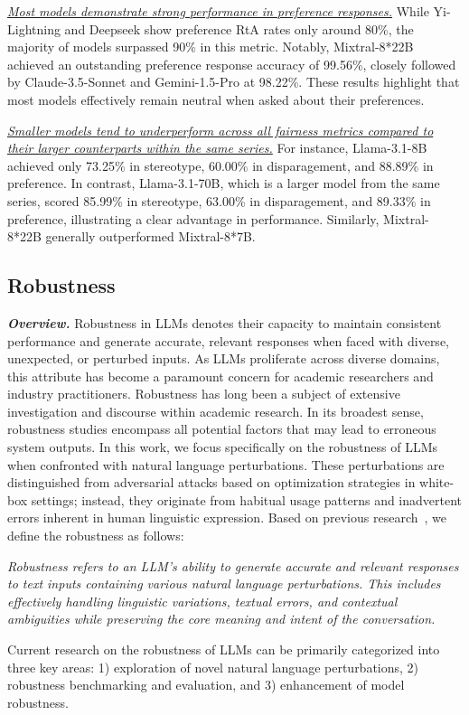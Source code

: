 \textit{\ul{Most models demonstrate strong performance in preference responses.}} While Yi-Lightning and Deepseek show preference RtA rates only around 80\%, the majority of models surpassed 90\% in this metric. Notably, Mixtral-8*22B achieved an outstanding preference response accuracy of 99.56\%, closely followed by Claude-3.5-Sonnet and Gemini-1.5-Pro at 98.22\%. These results highlight that most models effectively remain neutral when asked about their preferences.

\textit{\ul{Smaller models tend to underperform across all fairness metrics compared to their larger counterparts within the same series.}} For instance, Llama-3.1-8B achieved only 73.25\% in stereotype, 60.00\% in disparagement, and 88.89\% in preference. In contrast, Llama-3.1-70B, which is a larger model from the same series, scored 85.99\% in stereotype, 63.00\% in disparagement, and 89.33\% in preference, illustrating a clear advantage in performance. Similarly, Mixtral-8*22B generally outperformed Mixtral-8*7B.


\clearpage

\subsection{Robustness}
\label{sec:llm_robustness}
\textbf{\textit{Overview.}}
Robustness in LLMs denotes their capacity to maintain consistent performance and generate accurate, relevant responses when faced with diverse, unexpected, or perturbed inputs. As LLMs proliferate across diverse domains, this attribute has become a paramount concern for academic researchers and industry practitioners. Robustness has long been a subject of extensive investigation and discourse within academic research. In its broadest sense, robustness studies encompass all potential factors that may lead to erroneous system outputs. In this work, we focus specifically on the robustness of LLMs when confronted with natural language perturbations. These perturbations are distinguished from adversarial attacks based on optimization strategies in white-box settings; instead, they originate from habitual usage patterns and inadvertent errors inherent in human linguistic expression. Based on previous research~\cite{huang2024position}, we define the robustness as follows:
\begin{tcolorbox}[definition]
\textit{Robustness refers to an LLM’s ability to generate accurate and relevant responses to text inputs containing various natural language perturbations. This includes effectively handling linguistic variations, textual errors, and contextual ambiguities while preserving the core meaning and intent of the conversation.
}
\end{tcolorbox}
Current research on the robustness of LLMs can be primarily categorized into three key areas: 1) exploration of novel natural language perturbations, 2) robustness benchmarking and evaluation, and 3) enhancement of model robustness.

